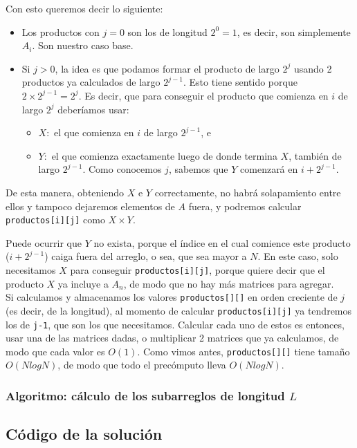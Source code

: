Con esto queremos decir lo siguiente: 
\begin{itemize}
\item Los productos con $j=0$ son los de longitud $2^0=1$, es decir, 
son simplemente $A_i$. Son nuestro caso base. 
\item Si $j>0$, la idea es que podamos formar el producto de largo $2^j$ 
usando 2 productos ya calculados de largo $2^{j-1}$. Esto tiene sentido 
porque $2 \times 2^{j-1} = 2^j$. Es decir, que para conseguir el producto 
que comienza en $i$ de largo $2^j$ deberíamos usar: 
    \begin{itemize}
    \item $X:$ el que comienza en $i$ de largo $2^{j-1}$, e 
    \item $Y:$ el que comienza exactamente luego de donde termina $X$, también de largo 
    $2^{j-1}$. Como conocemos $j$, sabemos que $Y$ comenzará en $i+2^{j-1}$.
    \end{itemize}
\end{itemize}

De esta manera, obteniendo $X$ e $Y$ correctamente, no habrá solapamiento entre ellos 
y tampoco dejaremos elementos de $A$ fuera, y podremos calcular \texttt{productos[i][j]} 
como $X \times Y$. 

Puede ocurrir que $Y$ no exista, porque el índice en el cual comience este producto 
($i+2^{j-1}$) caiga fuera del arreglo, o sea, que sea mayor a $N$. En este caso, 
solo necesitamos $X$ para conseguir \texttt{productos[i][j]}, porque quiere decir que 
el producto $X$ ya incluye a $A_n$, de modo que no hay más matrices para agregar. \\

Si calculamos y almacenamos los valores \texttt{productos[][]} en orden 
creciente de $j$ (es decir, de la longitud), al momento de calcular \texttt{productos[i][j]} 
ya tendremos los de \texttt{j-1}, que son los que necesitamos. Calcular cada uno de estos es entonces, 
usar una de las matrices dadas, o multiplicar 2 matrices que ya calculamos, de modo que 
cada valor es $O(1)$. Como vimos antes, \texttt{productos[][]} tiene tamaño $O(N log N)$, 
de modo que todo el precómputo lleva $O(N log N)$. 

\subsubsection{Algoritmo: cálculo de los subarreglos de longitud $L$}

\newpage
\subsection{Código de la solución}

